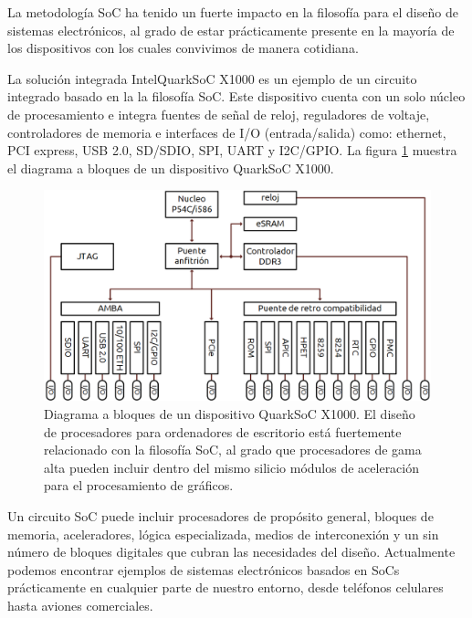 La metodología SoC ha tenido un fuerte impacto en la filosofía para el diseño de sistemas electrónicos, al grado de estar prácticamente presente en la mayoría de los dispositivos con los cuales convivimos de manera cotidiana.

La solución integrada Intel\textregistered  Quark\texttrademark  SoC X1000\cite{chapter1:INTEL:QUARK:DS} es un ejemplo de un circuito integrado basado en la la filosofía SoC. Este dispositivo cuenta con un solo núcleo de procesamiento e integra fuentes de señal de reloj, reguladores de voltaje, controladores de memoria e interfaces de I/O (entrada/salida) como: ethernet, PCI express, USB 2.0, SD/SDIO, SPI, UART y I2C/GPIO. La figura \ref{fig:ch1_quark_soc} muestra el diagrama a bloques de un dispositivo Quark\texttrademark  SoC X1000.

\begin{figure}
	\begin{center}
		\includegraphics[scale=0.6]{figures/ch1_quark_soc.png}
	\end{center}
	\caption
		{	
			Diagrama a bloques de un dispositivo Quark\texttrademark  SoC X1000. El diseño de procesadores para ordenadores de escritorio está fuertemente relacionado con la filosofía SoC, al grado que procesadores de gama alta pueden incluir dentro del mismo silicio módulos de aceleración para el procesamiento de gráficos.
		}
	\label{fig:ch1_quark_soc}
\end{figure}

Un circuito SoC puede incluir procesadores de propósito general, bloques de memoria, aceleradores, lógica especializada, medios de interconexión y un sin número de bloques digitales que cubran las necesidades del diseño. Actualmente podemos encontrar ejemplos de sistemas electrónicos basados en SoCs prácticamente en cualquier parte de nuestro entorno, desde teléfonos celulares hasta aviones comerciales.

